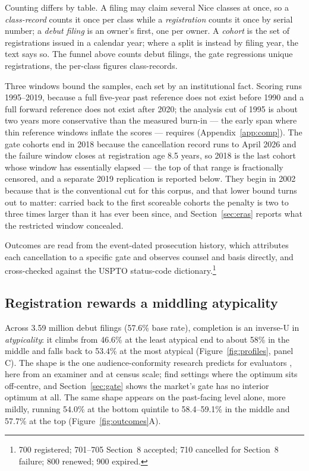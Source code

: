 Counting differs by table. A filing may claim several Nice classes at once, so
a \emph{class-record} counts it once per class while a \emph{registration}
counts it once by serial number; a \emph{debut filing} is an owner's first, one
per owner. A \emph{cohort} is the set of registrations issued in a calendar
year; where a split is instead by filing year, the text says so. The funnel
above counts debut filings, the gate regressions unique
registrations, the per-class figures class-records.

Three windows bound the samples, each set by an institutional fact. Scoring
runs 1995--2019, because a full
five-year past reference does not exist before 1990 and a full forward
reference does not exist after 2020; the analysis cut of 1995 is about two
years more conservative than the measured burn-in --- the early span where
thin reference windows inflate the scores --- requires
(Appendix~\ref{app:comp}). The gate cohorts end in 2018 because the
cancellation record runs to April 2026 and the failure window closes at
registration age 8.5 years, so 2018 is the last cohort whose window has
essentially elapsed --- the top of that range is fractionally censored, and
a separate 2019 replication is reported below. They begin in 2002 because
that is the conventional cut for this corpus, and that lower
bound turns out to matter: carried back to the first scoreable cohorts the
penalty is two to three times larger than it has ever been since, and
Section~\ref{sec:eras} reports what the restricted window concealed.

Outcomes are read from the event-dated prosecution history, which attributes
each cancellation to a specific gate and observes counsel and basis directly,
and cross-checked against the USPTO status-code dictionary.\footnote{700
registered; 701--705 Section~8 accepted; 710 cancelled for Section~8 failure;
800 renewed; 900 expired.}

\subsection{Registration rewards a middling atypicality}\label{sec:registration}

Across 3.59 million debut filings (57.6\% base rate), completion is an
inverse-U in \emph{atypicality}: it climbs from 46.6\% at the least atypical
end to about 58\% in the middle and falls back to 53.4\% at the most atypical
(Figure~\ref{fig:profiles}, panel C). The shape is the one audience-conformity
research predicts for evaluators \citep{Zuckerman1999, Hsu2006, Zhao2017},
here from an examiner and at census scale; \citet{TaeuscherRothe2020} find
settings where the optimum sits off-centre, and Section~\ref{sec:gate} shows
the market's gate has no interior optimum at all. The same shape appears on the
past-facing level alone, more mildly, running 54.0\% at the bottom quintile to
58.4--59.1\% in the middle and 57.7\% at the top (Figure~\ref{fig:outcomes}A).

